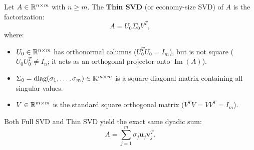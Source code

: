 \begin{definition}
\label{def:thin-svd-en}
Let $A \in \mathbb{R}^{n \times m}$ with $n \ge m$. The \textbf{Thin SVD} (or economy-size SVD) of $A$ is the factorization:
\begin{equation}
    A = U_0 \Sigma_0 V^T,
\end{equation}
where:
\begin{itemize}
    \item $U_0 \in \mathbb{R}^{n \times m}$ has orthonormal columns ($U_0^T U_0 = I_m$), but is not square ($U_0 U_0^T \neq I_n$; it acts as an orthogonal projector onto $\operatorname{Im}(A)$).
    \item $\Sigma_0 = \operatorname{diag}(\sigma_1, \dots, \sigma_m) \in \mathbb{R}^{m \times m}$ is a square diagonal matrix containing all singular values.
    \item $V \in \mathbb{R}^{m \times m}$ is the standard square orthogonal matrix ($V^T V = V V^T = I_m$).
\end{itemize}
\end{definition}

Both Full SVD and Thin SVD yield the exact same dyadic sum:
\begin{equation}
    A = \sum_{j=1}^m \sigma_j \mathbf{u}_j \mathbf{v}_j^T.
\end{equation}

